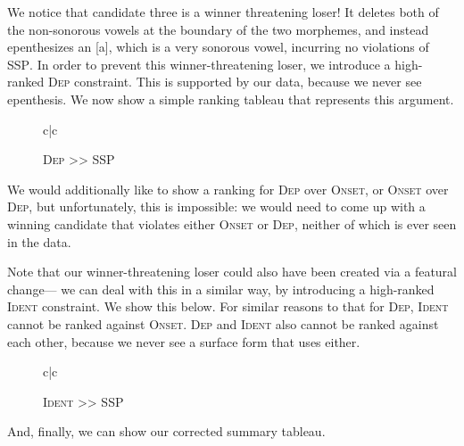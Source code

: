 \documentclass[12pt]{article}
\newcommand{\ident}{\textsc{Ident}}
\newcommand{\ssp}{\textsc{SSP}}
\newcommand{\dep}{\textsc{Dep}}
\newcommand{\onset}{\textsc{Onset}}
\begin{document}
We notice that candidate three is a winner threatening loser! It deletes both
of the non-sonorous vowels at the boundary of the two morphemes, and instead
epenthesizes an [a], which is a very sonorous vowel, incurring no violations of
\ssp. In order to prevent this winner-threatening loser, we introduce a
high-ranked \dep{} constraint. This is supported by our data, because we never
see epenthesis. We now show a simple ranking tableau that represents this argument.

\begin{figure}[h]
    \caption{\dep{} >> \ssp}
    \label{tableau:dep-wins}
    \begin{tableau}{c|c}
               \const{\dep} \const{\ssp}
         \vio{}       \vio{*****}
                   \vio{*!}     \vio{***}
    \end{tableau}
\end{figure}

We would additionally like to show a ranking for \dep{} over \onset, or
\onset{} over \dep, but unfortunately, this is impossible: we would need to
come up with a winning candidate that violates either \onset{} or \dep{},
neither of which is ever seen in the data.

Note that our winner-threatening loser could also have been created via a
featural change--- we can deal with this in a similar way, by introducing a
high-ranked \ident{} constraint. We show this below. For similar reasons to
that for \dep, \ident{} cannot be ranked against \onset. \dep{} and \ident{}
also cannot be ranked against each other, because we never see a surface
form that uses either.

\begin{figure}[h]
    \caption{\ident{} >> \ssp}
    \label{tableau:ident-wins}
    \begin{tableau}{c|c}
               \const{\ident} \const{\ssp}
         \vio{}         \vio{*****}
                   \vio{*!}       \vio{***}
    \end{tableau}
\end{figure}

And, finally, we can show our corrected summary tableau.
\end{document}
